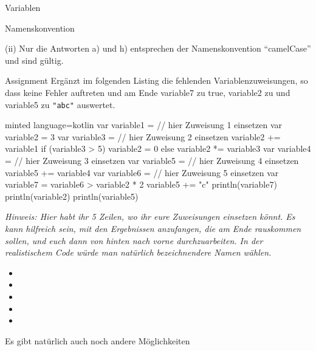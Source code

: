 \begin{task}[points=auto]{Variablen }
\begin{subtask*}[points=0]{Namenskonvention}
\begin{solution}
            (ii) Nur die Antworten a) und h) entsprechen der Namenskonvention \enquote{camelCase} und sind gültig.
        \end{solution}
    \end{subtask*}
    \begin{subtask*}[points=0]{Assignment}
        Ergänzt im folgenden Listing die fehlenden Variablenzuweisungen, so dass keine Fehler auftreten und am Ende {\ttfamily variable7} zu {\ttfamily true}, {\ttfamily variable2} zu {} und {\ttfamily variable5} zu {\ttfamily \verb+"abc"+} auswertet.
        \begin{codeBlock}[]{minted language=kotlin}
            var variable1 = // hier Zuweisung 1 einsetzen
            var variable2 = 3
            var variable3 = // hier Zuweisung 2 einsetzen
            variable2 += variable1
            if (variable3 > 5) {
                variable2 = 0
            } else {
                variable2 *= variable3
            }
            var variable4 = // hier Zuweisung 3 einsetzen
            var variable5 = // hier Zuweisung 4 einsetzen
            variable5 += variable4
            var variable6 = // hier Zuweisung 5 einsetzen
            var variable7 = variable6 > variable2 * 2
            variable5 += "c"
            println(variable7)
            println(variable2)
            println(variable5)
        \end{codeBlock}

        \textit{Hinweis: Hier habt ihr 5 Zeilen, wo ihr eure Zuweisungen einsetzen könnt. Es kann hilfreich sein, mit den Ergebnissen anzufangen, die am Ende rauskommen sollen, und euch dann von hinten nach vorne durchzuarbeiten. In der realistischem Code würde man natürlich bezeichnendere Namen wählen.}

        \begin{solution}
            \begin{itemize}
                \item {}
                \item {}
                \item {}
                \item {}
                \item {}
            \end{itemize}
            Es gibt natürlich auch noch andere Möglichkeiten
        \end{solution}
    \end{subtask*}
\end{task}
